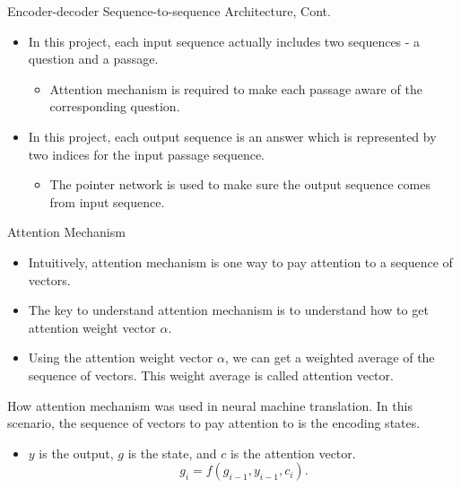 \documentclass{beamer}
\begin{document}
\begin{frame}{Encoder-decoder Sequence-to-sequence Architecture, Cont.}
    \begin{itemize}
        \item In this project, each input sequence actually includes two sequences - a question and a passage.
            \begin{itemize}
                \item Attention mechanism is required to make each passage aware of the corresponding question.
            \end{itemize}
        \item In this project, each output sequence is an answer which is represented by two indices for the input passage sequence.
            \begin{itemize}
                \item The pointer network is used to make sure the output sequence comes from input sequence.
            \end{itemize}
    \end{itemize}
\end{frame}

\begin{frame}{Attention Mechanism}
    \begin{itemize}
        \item Intuitively, attention mechanism is one way to pay attention to a sequence of vectors.
        \item The key to understand attention mechanism is to understand how to get attention weight vector $\alpha$.
        \item Using the attention weight vector $\alpha$, we can get a weighted average of the sequence of vectors. This weight average is called attention vector.
    \end{itemize}
    \begin{examples}
    How attention mechanism was used in neural machine translation. In this scenario, the sequence of vectors to pay attention to is the encoding states.
        \begin{itemize}
            \item $y$ is the output, $g$ is the state, and $c$ is the attention vector. $$g_i =f(g_{i-1},y_{i-1},c_i).$$

        \end{itemize}
    \end{examples}
\end{frame}
\end{document}
